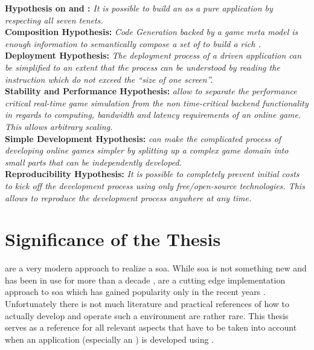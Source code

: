 \noindent\textbf{Hypothesis on \ogsucuc{} and \mssuc{}:}
\textit{It is possible to build an \og{} as a pure \ms{} application by
respecting all seven \ms{} tenets.}\\

\noindent\textbf{Composition Hypothesis:}
\textit{Code Generation backed by a game meta model is enough information to
semantically compose a set of \mss{} to build a rich \og{}.}\\

\noindent\textbf{Deployment Hypothesis:}
\textit{The deployment process of a \ms{} driven \og{} application can be
simplified to an extent that the process can be understood by reading the instruction which
do not exceed the ``size of one screen''.}\\

\noindent\textbf{Stability and Performance Hypothesis:} 
\textit{\mssuc{} allow to separate the performance critical real-time game
simulation from the non time-critical backend functionality in regards to
computing, bandwidth and latency requirements of an online game. This allows
arbitrary scaling.}\\

\noindent\textbf{Simple Development Hypothesis:} 
\textit{\mssuc{} can make the complicated process of developing online games
simpler by splitting up a complex game domain into small parts that can be independently
developed.}\\

\noindent\textbf{Reproducibility Hypothesis:} 
\textit{It is possible to completely prevent initial costs to kick off the
development process using only free/open-source technologies. This allows to reproduce the
development process anywhere at any time.}

\section{Significance of the Thesis}

\mssuc{} are a very modern approach to realize a \gls{soa}. While \gls{soa} is
not something new and has been in use for more than a decade \cite{josuttis2007soa},
\mss{} are a cutting edge implementation approach to \gls{soa} which has gained
popularity only in the recent years \cite{rajeev2016ms_popular}. Unfortunately
there is not much literature and practical references of how to actually develop
and operate such a \ms{} environment are rather rare. This thesis serves as a
reference for all relevant aspects that have to be taken into account when an
application (especially an \og{}) is developed using \mss{}.

